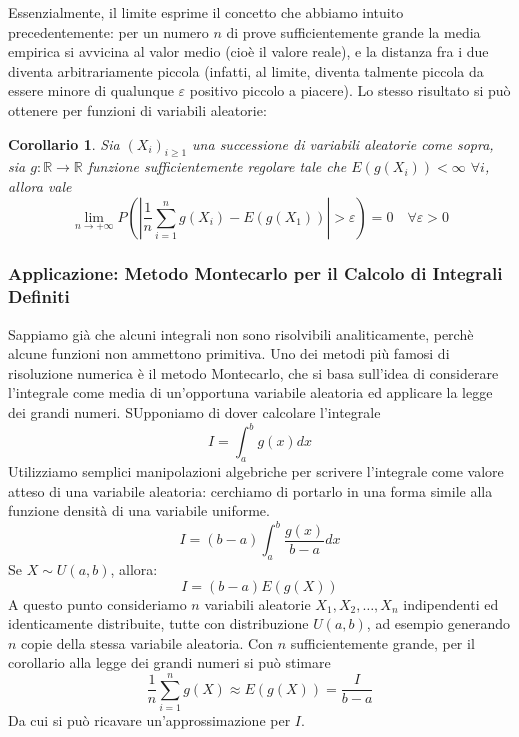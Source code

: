 \documentclass{article}
\theoremstyle{plain}
\newtheorem*{corollario}{Corollario}
\theoremstyle{definition}
\theoremstyle{remark}
\begin{document}
Essenzialmente, il limite esprime il concetto che abbiamo intuito precedentemente: per un numero $n$ di prove sufficientemente grande la media empirica si avvicina al valor medio (cioè il valore reale), e la distanza fra i due diventa arbitrariamente piccola (infatti, al limite, diventa talmente piccola da essere minore di qualunque $\varepsilon$ positivo piccolo a piacere). Lo stesso risultato si può ottenere per funzioni di variabili aleatorie:
\begin{corollario}
	Sia $(X_i)_{i\geq1}$ una successione di variabili aleatorie come sopra, sia $g:\mathds{R}\to\mathds{R}$ funzione sufficientemente regolare tale che $E(g(X_i))<\infty$ $\forall i$, allora vale
	\begin{equation*}
		\lim_{n\to+\infty}P\left(\left|\frac{1}{n}\sum_{i=1}^ng(X_i)-E(g(X_1))\right|>\varepsilon\right)=0\quad\forall\varepsilon>0
	\end{equation*}
\end{corollario}
\subsubsection{Applicazione: Metodo Montecarlo per il Calcolo di Integrali Definiti} %
\label{ssub:applicazione_metodo_montecarlo_per_il_calcolo_di_integrali_definiti}
Sappiamo già che alcuni integrali non sono risolvibili analiticamente, perchè alcune funzioni non ammettono primitiva. Uno dei metodi più famosi di risoluzione numerica è il metodo Montecarlo, che si basa sull'idea di considerare l'integrale come media di un'opportuna variabile aleatoria ed applicare la legge dei grandi numeri. SUpponiamo di dover calcolare l'integrale
\begin{equation*}
	I=\int_a^bg(x)dx
\end{equation*}
Utilizziamo semplici manipolazioni algebriche per scrivere l'integrale come valore atteso di una variabile aleatoria: cerchiamo di portarlo in una forma simile alla funzione densità di una variabile uniforme.
\begin{equation*}
	I=(b-a)\int_a^b\frac{g(x)}{b-a}dx
\end{equation*}
Se $X\sim U(a,b)$, allora:
\begin{equation*}
	I=(b-a)E(g(X))
\end{equation*}
A questo punto consideriamo $n$ variabili aleatorie $X_1,X_2,\dots,X_n$ indipendenti ed identicamente distribuite, tutte con distribuzione $U(a,b)$, ad esempio generando $n$ copie della stessa variabile aleatoria. Con $n$ sufficientemente grande, per il corollario alla legge dei grandi numeri si può stimare
\begin{equation*}
	\frac{1}{n}\sum_{i=1}^ng(X)\approx E(g(X))=\frac{I}{b-a}
\end{equation*}
Da cui si può ricavare un'approssimazione per $I$.
\end{document}
